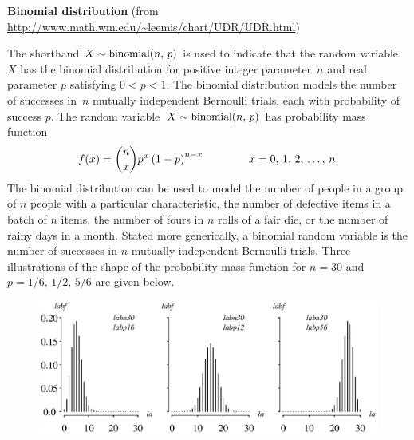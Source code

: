 \documentclass[12pt,fullpage]{article}
\begin{document}
\noindent
{\bf Binomial distribution} (from \color{blue}\url{http://www.math.wm.edu/~leemis/chart/UDR/UDR.html}\color{black})

\noindent
The shorthand $X \sim {\rm binomial}(n, \, p)$ is used to indicate that the
random variable~$X$ has the binomial distribution for
positive integer parameter~$n$ and real parameter $p$ satisfying $0<p<1$.
The binomial distribution models the number of successes in~$n$ mutually independent
Bernoulli trials, each with probability of success $p$.
The random variable~$X \sim {\rm binomial}(n, \, p)$ has probability mass function 
$$
f(x) = {n \choose x} p ^ {\kern 0.04em x} \left( 1 - p \right) ^ {n - x} \qquad \qquad x = 0, \, 1, \, 2, \, \ldots , \, n.
$$
The binomial distribution can be used to model the number of people in a group
of $n$ people with a particular characteristic, the number of defective items in a batch of $n$ items,
the number of fours in $n$ rolls of a fair die, or the number of rainy days in a month.
Stated more generically, a binomial random variable is the number of successes in $n$ mutually independent
Bernoulli trials.
Three illustrations of the shape of the probability mass function
for $n = 30$ and $p = 1/6, \, 1/2, \, 5/6$ are given below.

\begin{figure}[h!]
\begin{center}
\includegraphics[width=5.6in]{BinomialPlot.ps}
\end{center}
\end{figure}
\end{document}
